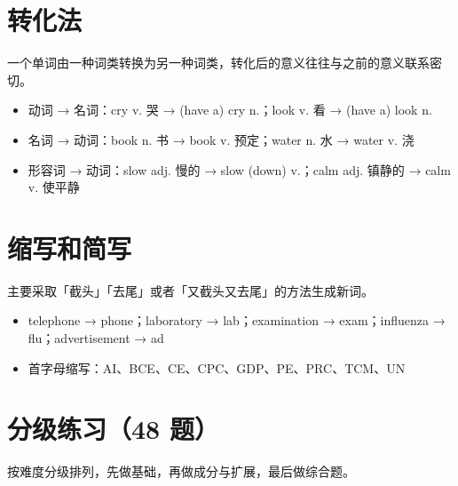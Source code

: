 \documentclass[11pt,a4paper]{ctexart}
\begin{document}
\section{转化法}
一个单词由一种词类转换为另一种词类，转化后的意义往往与之前的意义联系密切。
\begin{itemize}[leftmargin=1.4em]
\item 动词 → 名词：cry v. 哭 → (have a) cry n.；look v. 看 → (have a) look n.
\item 名词 → 动词：book n. 书 → book v. 预定；water n. 水 → water v. 浇
\item 形容词 → 动词：slow adj. 慢的 → slow (down) v.；calm adj. 镇静的 → calm v. 使平静
\end{itemize}

\section{缩写和简写}
主要采取「截头」「去尾」或者「又截头又去尾」的方法生成新词。
\begin{itemize}[leftmargin=1.4em]
\item telephone → phone；laboratory → lab；examination → exam；influenza → flu；advertisement → ad
\item 首字母缩写：AI、BCE、CE、CPC、GDP、PE、PRC、TCM、UN
\end{itemize}


\newpage
\section{分级练习（48 题）}
\noindent 按难度分级排列，先做基础，再做成分与扩展，最后做综合题。
\end{document}
